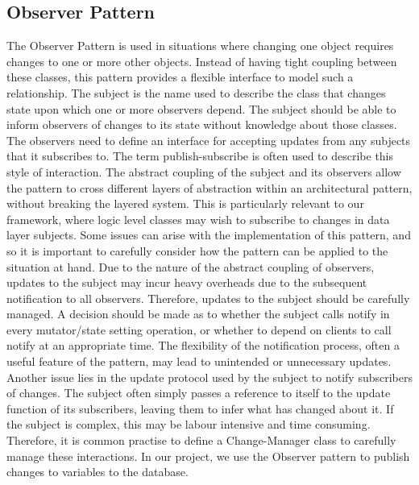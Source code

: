 \documentclass[11pt]{report}
\begin{document}
	\subsection{Observer Pattern}
	The Observer Pattern is used in situations where changing one object requires changes to one or more other objects. Instead of having tight coupling between these classes, this pattern provides a flexible interface to model such a relationship. The subject is the name used to describe the class that changes state upon which one or more observers depend. The subject should be able to inform observers of changes to its state without knowledge about those classes. The observers need to define an interface for accepting updates from any subjects that it subscribes to. The term publish-subscribe is often used to describe this style of interaction. The abstract coupling of the subject and its observers allow the pattern to cross different layers of abstraction within an architectural pattern, without breaking the layered system. This is particularly relevant to our framework, where logic level classes may wish to subscribe to changes in data layer subjects. Some issues can arise with the implementation of this pattern, and so it is important to carefully consider how the pattern can be applied to the situation at hand. Due to the nature of the abstract coupling of observers, updates to the subject may incur heavy overheads due to the subsequent notification to all observers. Therefore, updates to the subject should be carefully managed. A decision should be made as to whether the subject calls notify in every mutator/state setting operation, or whether to depend on clients to call notify at an appropriate time. The flexibility of the notification process, often a useful feature of the pattern, may lead to unintended or unnecessary updates. Another issue lies in the update protocol used by the subject to notify subscribers of changes. The subject often simply passes a reference to itself to the update function of its subscribers, leaving them to infer what has changed about it. If the subject is complex, this may be labour intensive and time consuming. Therefore, it is common practise to define a Change-Manager class to carefully manage these interactions. In our project, we use the Observer pattern to publish changes to variables to the database.
\end{document}
